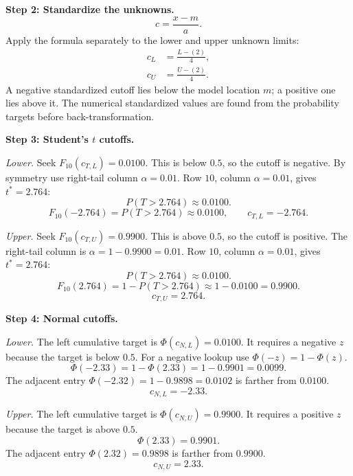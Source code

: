 \begin{enumerate}[leftmargin=*,label=\textbf{\arabic*.},itemsep=12pt,parsep=3pt,topsep=5pt]
\begin{minipage}[t]{\linewidth}
\end{minipage}\par
\par\noindent\begin{minipage}{\linewidth}
\par\textbf{Step 2: Standardize the unknowns.}\nopagebreak\enspace \[
c=\frac{x-m}{a}.
\]
Apply the formula separately to the lower and upper unknown limits:
\[
\begin{aligned}c_L&=\frac{L-(2)}{4},\\c_U&=\frac{U-(2)}{4}.\end{aligned}
\]
A negative standardized cutoff lies below the model location $m$; a positive one lies above it. The numerical standardized values are found from the probability targets before back-transformation.
\end{minipage}\par
\par\noindent\begin{minipage}{\linewidth}
\par\textbf{Step 3: Student's $t$ cutoffs.}\nopagebreak\enspace \par\textit{Lower.} Seek $F_{10}(c_{T,L})=0.0100$. This is below $0.5$, so the cutoff is negative. By symmetry use right-tail column $\alpha=0.01$. Row $10$, column $\alpha=0.01$, gives $t^*=2.764$:\[
P(T>2.764)\approx0.0100.
\]
\[
F_{10}(-2.764)=P(T>2.764)\approx0.0100,\qquad c_{T,L}=-2.764.
\]
\par\textit{Upper.} Seek $F_{10}(c_{T,U})=0.9900$. This is above $0.5$, so the cutoff is positive. The right-tail column is $\alpha=1-0.9900=0.01$. Row $10$, column $\alpha=0.01$, gives $t^*=2.764$:\[
P(T>2.764)\approx0.0100.
\]
\[
F_{10}(2.764)=1-P(T>2.764)\approx1-0.0100=0.9900.
\]
\[
c_{T,U}=2.764.
\]

\end{minipage}\par
\par\textbf{Step 4: Normal cutoffs.}\nopagebreak\enspace \par\noindent\begin{minipage}{\linewidth}
\par\textit{Lower.} The left cumulative target is $\Phi(c_{N,L})=0.0100$. It requires a negative $z$ because the target is below $0.5$. For a negative lookup use $\Phi(-z)=1-\Phi(z)$.\[
\Phi(-2.33)=1-\Phi(2.33)=1-0.9901=0.0099.
\]
The adjacent entry $\Phi(-2.32)=1-0.9898=0.0102$ is farther from $0.0100$.\[
c_{N,L}=-2.33.
\]
\end{minipage}\par
\par\noindent\begin{minipage}{\linewidth}
\par\textit{Upper.} The left cumulative target is $\Phi(c_{N,U})=0.9900$. It requires a positive $z$ because the target is above $0.5$.\[
\Phi(2.33)=0.9901.
\]
The adjacent entry $\Phi(2.32)=0.9898$ is farther from $0.9900$.\[
c_{N,U}=2.33.
\]
\end{minipage}\par


\end{enumerate}
